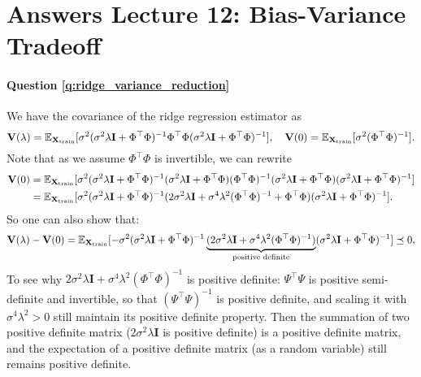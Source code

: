 \section{Answers Lecture 12: Bias-Variance Tradeoff}

\paragraph{Question \ref{q:ridge_variance_reduction}}
We have the covariance of the ridge regression estimator as
\begin{equation*}
\mathbf V(\lambda) = \mathbb{E}_{\mathbf{X}_{\text{train}}}[ \sigma^2 (\sigma^2 \lambda \mathbf{I} + \Phi^\top \Phi )^{-1} \Phi^\top \Phi (\sigma^2 \lambda \mathbf{I} + \Phi^\top \Phi )^{-1} ], \quad \mathbf V(0) = \mathbb{E}_{\mathbf{X}_{\text{train}}}[ \sigma^2 ( \Phi^\top \Phi )^{-1} ].
\end{equation*}
Note that as we assume $\Phi^\top \Phi$ is invertible, we can rewrite
\begin{equation*}
\begin{aligned}
\mathbf V(0) &= \mathbb{E}_{\mathbf{X}_{\text{train}}}[  \sigma^2 (\sigma^2 \lambda \mathbf{I} + \Phi^\top \Phi )^{-1} (\sigma^2 \lambda \mathbf{I} + \Phi^\top \Phi ) ( \Phi^\top \Phi )^{-1} (\sigma^2 \lambda \mathbf{I} + \Phi^\top \Phi ) (\sigma^2 \lambda \mathbf{I} + \Phi^\top \Phi )^{-1} ] \\
&= \mathbb{E}_{\mathbf{X}_{\text{train}}}[ \sigma^2 (\sigma^2 \lambda \mathbf{I} + \Phi^\top \Phi )^{-1} (2\sigma^2 \lambda \mathbf{I} + \sigma^4 \lambda^2 (\Phi^\top \Phi)^{-1} + \Phi^\top \Phi ) (\sigma^2 \lambda \mathbf{I} + \Phi^\top \Phi )^{-1} ].
\end{aligned}
\end{equation*}
So one can also show that:
\begin{equation*}
\mathbf V(\lambda) - \mathbf V(0) = \mathbb{E}_{\mathbf{X}_{\text{train}}}[ -\sigma^2 (\sigma^2 \lambda \mathbf{I} + \Phi^\top \Phi )^{-1} \underbrace{(2\sigma^2 \lambda \mathbf{I} + \sigma^4 \lambda^2 (\Phi^\top \Phi)^{-1} )}_{\text{positive definite}} (\sigma^2 \lambda \mathbf{I} + \Phi^\top \Phi )^{-1} ] \preceq 0,
\end{equation*}
To see why $2\sigma^2 \lambda \mathbf{I} + \sigma^4 \lambda^2 (\Phi^\top \Phi)^{-1}$ is positive definite: $\Psi^\top \Psi$ is positive semi-definite and invertible, so that $(\Psi^\top \Psi)^{-1}$ is positive definite, and scaling it with $\sigma^4 \lambda^2 > 0$ still maintain its positive definite property. Then the summation of two positive definite matrix ($2 \sigma^2 \lambda \mathbf{I}$ is positive definite) is a positive definite matrix, and the expectation of a positive definite matrix (as a random variable) still remains positive definite.

